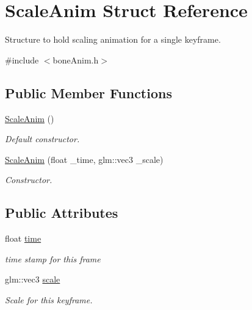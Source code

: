 \hypertarget{structScaleAnim}{}\section{Scale\+Anim Struct Reference}
\label{structScaleAnim}


Structure to hold scaling animation for a single keyframe.  




{\ttfamily \#include $<$bone\+Anim.\+h$>$}

\subsection*{Public Member Functions}
\begin{DoxyCompactItemize}
\item 
\hyperlink{structScaleAnim_a425c782bb83703effdce17da746b5b7a}{Scale\+Anim} ()\hypertarget{structScaleAnim_a425c782bb83703effdce17da746b5b7a}{}\label{structScaleAnim_a425c782bb83703effdce17da746b5b7a}

\begin{DoxyCompactList}\small\item\em Default constructor. \end{DoxyCompactList}\item 
\hyperlink{structScaleAnim_a1b32409837c29bc9cdea7ef622cb24bf}{Scale\+Anim} (float \+\_\+time, glm\+::vec3 \+\_\+scale)\hypertarget{structScaleAnim_a1b32409837c29bc9cdea7ef622cb24bf}{}\label{structScaleAnim_a1b32409837c29bc9cdea7ef622cb24bf}

\begin{DoxyCompactList}\small\item\em Constructor. \end{DoxyCompactList}\end{DoxyCompactItemize}
\subsection*{Public Attributes}
\begin{DoxyCompactItemize}
\item 
float \hyperlink{structScaleAnim_a9f1cc947f127a63b6312d65e45ea06cf}{time}\hypertarget{structScaleAnim_a9f1cc947f127a63b6312d65e45ea06cf}{}\label{structScaleAnim_a9f1cc947f127a63b6312d65e45ea06cf}

\begin{DoxyCompactList}\small\item\em time stamp for this frame \end{DoxyCompactList}\item 
glm\+::vec3 \hyperlink{structScaleAnim_a648ab7e5bb8ffa64d51ef3c8f5a5290c}{scale}\hypertarget{structScaleAnim_a648ab7e5bb8ffa64d51ef3c8f5a5290c}{}\label{structScaleAnim_a648ab7e5bb8ffa64d51ef3c8f5a5290c}

\begin{DoxyCompactList}\small\item\em Scale for this keyframe. \end{DoxyCompactList}\end{DoxyCompactItemize}


